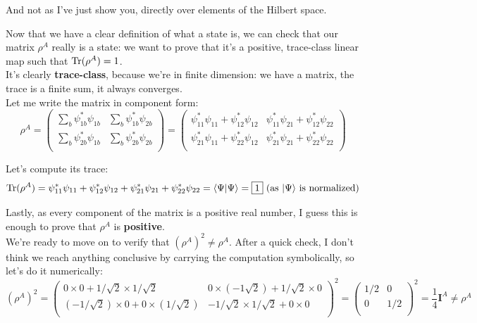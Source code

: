 \documentclass[solutions.tex]{subfiles}
\begin{document}
And not as I've just show you, directly over elements of the Hilbert space.

\hrr

Now that we have a clear definition of what a state is, we can check
that our matrix $\rho^A$ really is a state: we want to prove that it's
a positive, trace-class linear map such that $\text{Tr}(\rho^A) = 1$. \\

It's clearly \textbf{trace-class}, because we're in finite dimension:
we have a matrix, the trace is a finite sum, it always converges. \\

Let me write the matrix in component form:
\[
	\rho^A = \begin{pmatrix}
		\displaystyle\sum_b\psi_{1 b}^*\psi_{1 b}
			& \displaystyle\sum_b\psi_{1 b}^*\psi_{2 b} \\
		\displaystyle\sum_b\psi_{2 b}^*\psi_{1 b}
			& \displaystyle\sum_b\psi_{2 b}^*\psi_{2 b} \\
	\end{pmatrix} = \begin{pmatrix}
		\psi_{11}^*\psi_{11} + \psi_{12}^*\psi_{12}
			& \psi_{11}^*\psi_{21} + \psi_{12}^*\psi_{22} \\
		\psi_{21}^*\psi_{11} + \psi_{22}^*\psi_{12}
			& \psi_{21}^*\psi_{21} + \psi_{22}^*\psi_{22} \\
	\end{pmatrix}
\]

Let's compute its trace:
\[
	\text{Tr}(\rho^A) = \psi_{11}^*\psi_{11} + \psi_{12}^*\psi_{12}
		+ \psi_{21}^*\psi_{21} + \psi_{22}^*\psi_{22}
		= \left\langle \Psi \middle| \Psi \right\rangle = \boxed{1} \text{ (as $|\Psi\rangle$
		is normalized)}
\]

Lastly, as every component of the matrix is a positive real number,
I guess this is enough to prove that $\rho^A$ is \textbf{positive}. \\

We're ready to move on to verify that $(\rho^A)^2 \neq \rho^A$. After
a quick check, I don't think we reach anything conclusive by carrying
the computation symbolically, so let's do it numerically:
\[
	(\rho^A)^2 = \begin{pmatrix}
		0\times 0 + 1/\sqrt2\times1/\sqrt2
			& 0\times(-1\sqrt2) + 1/\sqrt2\times 0 \\
		(-1/\sqrt2)\times 0 + 0\times(1/\sqrt2)
			& -1/\sqrt2\times1/\sqrt2 + 0\times0 \\
	\end{pmatrix}^2 = \begin{pmatrix}
		1/2 & 0 \\
		0   & 1/2 \\
	\end{pmatrix}^2 = \frac14\bm{I}^A \neq \rho^A
\]
\end{document}
